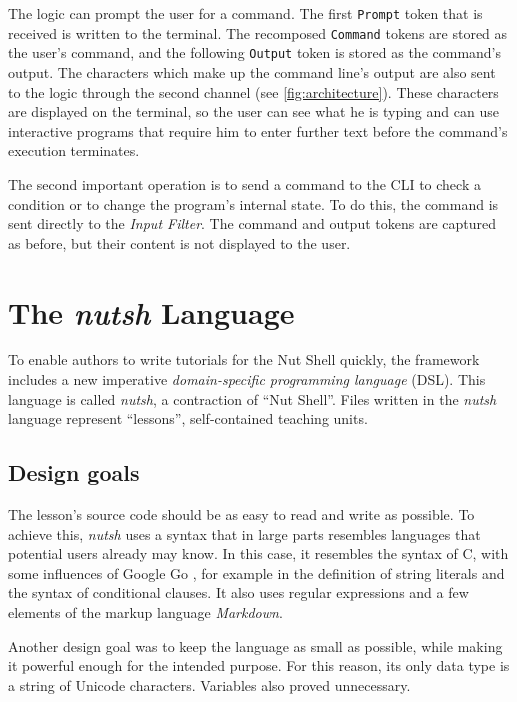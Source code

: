 \documentclass[paper=a4,abstract=on,cleardoublepage=empty,numbers=noenddot,toc=bib,12pt,appendixprefix=true]{scrreprt}
\begin{document}
The logic can prompt the user for a command. The first \texttt{Prompt} token that is received is written to the terminal. The recomposed \texttt{Command} tokens are stored as the user's command, and the following \texttt{Output} token is stored as the command's output. The characters which make up the command line's output are also sent to the logic through the second channel (see \cref{fig:architecture}). These characters are displayed on the terminal, so the user can see what he is typing and can use interactive programs that require him to enter further text before the command's execution terminates.

The second important operation is to send a command to the \textsc{CLI} to check a condition or to change the program's internal state. To do this, the command is sent directly to the \emph{Input Filter}. The command and output tokens are captured as before, but their content is not displayed to the user.

\chapter{The \emph{nutsh} Language}
\label{sec:lang}

To enable authors to write tutorials for the Nut Shell quickly, the framework includes a new imperative \emph{domain-specific programming language} (\textsc{DSL}). This language is called \emph{nutsh}, a contraction of “Nut Shell”. Files written in the \emph{nutsh} language represent “lessons”, self-contained teaching units.

\section{Design goals}

The lesson's source code should be as easy to read and write as possible. To achieve this, \emph{nutsh} uses a syntax that in large parts resembles languages that potential users already may know. In this case, it resembles the syntax of C, with some influences of Google Go \cite{google13}, for example in the definition of string literals and the syntax of conditional clauses. It also uses regular expressions and a few elements of the markup language \emph{Markdown}.

Another design goal was to keep the language as small as possible, while making it powerful enough for the intended purpose. For this reason, its only data type is a string of Unicode characters. Variables also proved unnecessary.
\end{document}
